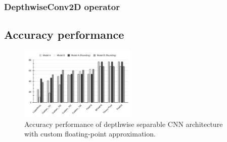 \subsubsection{DepthwiseConv2D operator}
\subsection{Accuracy performance}


\begin{figure}[t!]
	\centering
	\includegraphics[width=0.5\textwidth]{../figures/all_models_accuracy.pdf}
	\caption{Accuracy performance of depthwise separable CNN architecture with custom floating-point approximation.}
	\label{fig:acc_custom}
\end{figure}

